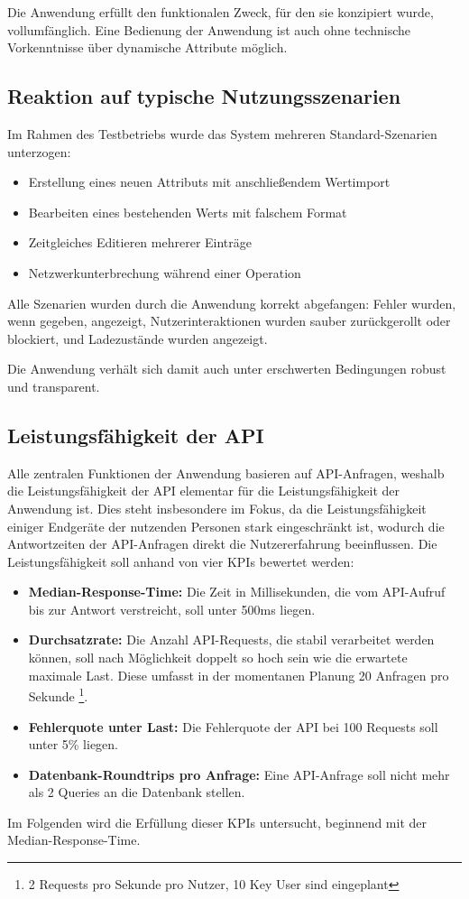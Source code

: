 Die Anwendung erfüllt den funktionalen Zweck, für den sie konzipiert wurde, vollumfänglich. Eine Bedienung der Anwendung ist auch ohne technische Vorkenntnisse
über dynamische Attribute möglich.

\subsection{Reaktion auf typische Nutzungsszenarien}
Im Rahmen des Testbetriebs wurde das System mehreren Standard-Szenarien unterzogen:
\begin{itemize}
    \item Erstellung eines neuen Attributs mit anschließendem Wertimport
    \item Bearbeiten eines bestehenden Werts mit falschem Format
    \item Zeitgleiches Editieren mehrerer Einträge
    \item Netzwerkunterbrechung während einer Operation
\end{itemize}

Alle Szenarien wurden durch die Anwendung korrekt abgefangen: Fehler wurden, wenn gegeben, angezeigt, Nutzerinteraktionen wurden sauber zurückgerollt oder blockiert,
und Ladezustände wurden angezeigt.

Die Anwendung verhält sich damit auch unter erschwerten Bedingungen robust und transparent.
\subsection{Leistungsfähigkeit der API}
Alle zentralen Funktionen der Anwendung basieren auf API-Anfragen, weshalb die Leistungsfähigkeit der API elementar für die Leistungsfähigkeit der Anwendung ist.
Dies steht insbesondere im Fokus, da die Leistungsfähigkeit einiger Endgeräte der nutzenden Personen stark eingeschränkt ist, wodurch die Antwortzeiten der API-Anfragen 
direkt die Nutzererfahrung beeinflussen. 
Die Leistungsfähigkeit soll anhand von vier KPIs bewertet werden:
\begin{itemize}
    \item \textbf{Median-Response-Time:} Die Zeit in Millisekunden, die vom API-Aufruf bis zur Antwort verstreicht, soll unter 500ms liegen.
    \item \textbf{Durchsatzrate:} Die Anzahl API-Requests, die stabil verarbeitet werden können, soll nach Möglichkeit doppelt so hoch sein wie die erwartete maximale Last. 
    Diese umfasst in der momentanen Planung 20 Anfragen pro Sekunde \footnote{2 Requests pro Sekunde pro Nutzer, 10 Key User sind eingeplant}.
    \item \textbf{Fehlerquote unter Last:} Die Fehlerquote der API bei 100 Requests soll unter 5\% liegen.
    \item \textbf{Datenbank-Roundtrips pro Anfrage:} Eine API-Anfrage soll nicht mehr als 2 Queries an die Datenbank stellen.
\end{itemize}
Im Folgenden wird die Erfüllung dieser KPIs untersucht, beginnend mit der Median-Response-Time.

